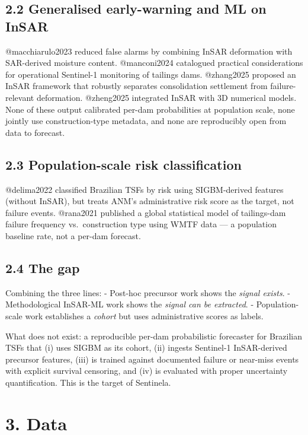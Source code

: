 \documentclass[
  11pt]{article}
\newcounter{none} %
\begin{document}
\subsection{2.2 Generalised early-warning and ML on
InSAR}\label{generalised-early-warning-and-ml-on-insar}

@macchiarulo2023 reduced false alarms by combining InSAR deformation
with SAR-derived moisture content. @manconi2024 catalogued practical
considerations for operational Sentinel-1 monitoring of tailings dams.
@zhang2025 proposed an InSAR framework that robustly separates
consolidation settlement from failure-relevant deformation. @zheng2025
integrated InSAR with 3D numerical models. None of these output
calibrated per-dam probabilities at population scale, none jointly use
construction-type metadata, and none are reproducibly open from data to
forecast.

\subsection{2.3 Population-scale risk
classification}\label{population-scale-risk-classification}

@delima2022 classified Brazilian TSFs by risk using SIGBM-derived
features (without InSAR), but treats ANM's administrative risk score as
the target, not failure events. @rana2021 published a global statistical
model of tailings-dam failure frequency vs.~construction type using WMTF
data --- a population baseline rate, not a per-dam forecast.

\subsection{2.4 The gap}\label{the-gap}

Combining the three lines: - Post-hoc precursor work shows the
\emph{signal exists}. - Methodological InSAR-ML work shows the
\emph{signal can be extracted}. - Population-scale work establishes a
\emph{cohort} but uses administrative scores as labels.

What does not exist: a reproducible per-dam probabilistic forecaster for
Brazilian TSFs that (i) uses SIGBM as its cohort, (ii) ingests
Sentinel-1 InSAR-derived precursor features, (iii) is trained against
documented failure or near-miss events with explicit survival censoring,
and (iv) is evaluated with proper uncertainty quantification. This is
the target of Sentinela.

\section{3. Data}\label{data}
\end{document}
